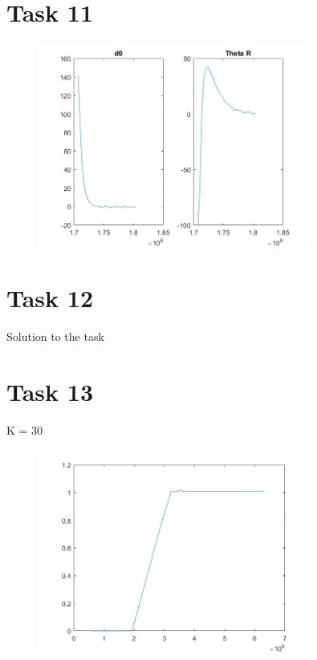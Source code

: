 \documentclass[a4paper,12pt,oneside,onecolumn]{article} %
\begin{document}
\section*{Task 11}

\begin{figure}[H]
\begin{center}	
  \includegraphics[width = 0.8\textwidth]{task11.png}
 \end{center}
\end{figure}

\section*{Task 12}

Solution to the task

\section*{Task 13}
K = 30
\begin{figure}[H]
\begin{center}	
  \includegraphics[width = 0.8\textwidth]{task13.png}
 \end{center}
\end{figure}
\end{document}
